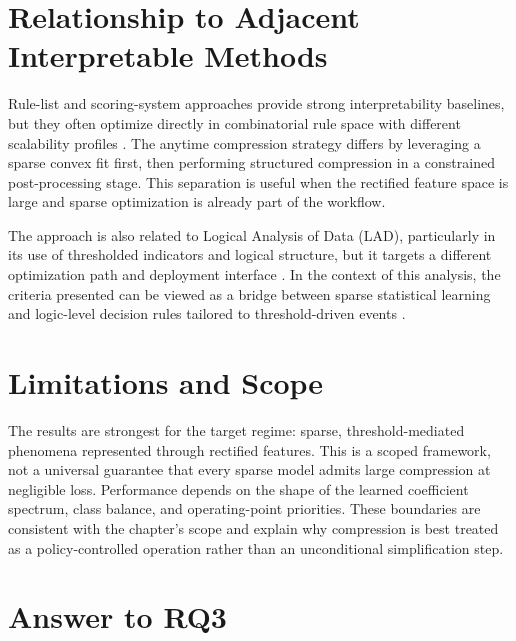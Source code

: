 \section{Relationship to Adjacent Interpretable Methods}

Rule-list and scoring-system approaches provide strong interpretability baselines, but they often optimize directly in combinatorial rule space with different scalability profiles \autocite{EAngelino2018Learning,CRudin2019Stop}. The anytime compression strategy differs by leveraging a sparse convex fit first, then performing structured compression in a constrained post-processing stage. This separation is useful when the rectified feature space is large and sparse optimization is already part of the workflow.

The approach is also related to Logical Analysis of Data (LAD), particularly in its use of thresholded indicators and logical structure, but it targets a different optimization path and deployment interface \autocite{EBoros1997Logical,EBoros2000implementation}. In the context of this analysis, the criteria presented can be viewed as a bridge between sparse statistical learning and logic-level decision rules tailored to threshold-driven events \autocite{orender2022,JOrender2025Efficient}.

\section{Limitations and Scope}

The results are strongest for the target regime: sparse, threshold-mediated phenomena represented through rectified features. This is a scoped framework, not a universal guarantee that every sparse model admits large compression at negligible loss. Performance depends on the shape of the learned coefficient spectrum, class balance, and operating-point priorities. These boundaries are consistent with the chapter's scope and explain why compression is best treated as a policy-controlled operation rather than an unconditional simplification step.

\section{Answer to RQ3}

